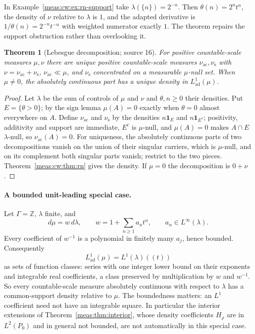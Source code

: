\documentclass[11pt]{article}
\numberwithin{equation}{section}
\newtheorem{theorem}{Theorem}[section]
\theoremstyle{definition}
\theoremstyle{remark}
\newcommand{\Z}{\mathbb Z}
\newcommand{\ind}{\mathbf 1}
\newcommand{\Lad}{L^1_{\mathrm{ad}}}
\begin{document}
In Example~\ref{meas:cw:ex:rn-support} take $\lambda(\{n\})=2^{-n}$. Then
$\theta(n)=2^nt^n$, the density of $\nu$ relative to $\lambda$ is $1$, and the adapted
derivative is $1/\theta(n)=2^{-n}t^{-n}$ with weighted numerator exactly $1$. The
theorem repairs the support obstruction rather than overlooking it.

\begin{theorem}[Lebesgue decomposition; source 16]\label{meas:cw:thm:lebesgue}
For positive countable-scale measures $\mu,\nu$ there are unique positive
countable-scale measures $\nu_{\mathrm{ac}},\nu_{\mathrm s}$ with
$\nu=\nu_{\mathrm{ac}}+\nu_{\mathrm s}$, $\nu_{\mathrm{ac}}\ll\mu$, and
$\nu_{\mathrm s}$ concentrated on a measurable $\mu$-null set. When $\mu\ne0$, the
absolutely continuous part has a unique density in $\Lad(\mu)$.
\end{theorem}
\begin{proof}
Let $\lambda$ be the sum of controls of $\mu$ and $\nu$ and $\theta,n\ge0$ their
densities. Put $E=\{\theta>0\}$; by the sign lemma $\mu(A)=0$ exactly when $\theta=0$
almost everywhere on $A$. Define $\nu_{\mathrm{ac}}$ and $\nu_{\mathrm s}$ by the
densities $n\ind_E$ and $n\ind_{E^c}$; positivity, additivity and support are
immediate, $E^c$ is $\mu$-null, and $\mu(A)=0$ makes $A\cap E$ $\lambda$-null, so
$\nu_{\mathrm{ac}}(A)=0$. For uniqueness, the absolutely continuous parts of two
decompositions vanish on the union of their singular carriers, which is
$\mu$-null, and on its complement both singular parts vanish; restrict to the two
pieces. Theorem~\ref{meas:cw:thm:rn} gives the density. If $\mu=0$ the
decomposition is $0+\nu$.
\end{proof}

\paragraph{A bounded unit-leading special case.} Let $\Gamma=\Z$, $\lambda$ finite, and
\begin{equation}\label{meas:cw:eq:bounded-unit}
 d\mu=w\,d\lambda,\qquad w=1+\sum_{n\ge1}a_nt^n,\qquad a_n\in L^\infty(\lambda).
\end{equation}
Every coefficient of $w^{-1}$ is a polynomial in finitely many $a_j$, hence
bounded. Consequently
\begin{equation}\label{meas:cw:eq:domain-unit}
 \Lad(\mu)=L^1(\lambda)((t))
\end{equation}
as sets of function classes: series with one integer lower bound on their
exponents and integrable real coefficients, a class preserved by multiplication
by $w$ and $w^{-1}$. So every countable-scale measure absolutely continuous with
respect to $\lambda$ has a common-support density relative to $\mu$. The
boundedness matters: an $L^1$ coefficient need not have an integrable square.
In particular the interior extensions of Theorem~\ref{meas:thm:interior}, whose
density coefficients $H_\rho$ are in $L^2(P_0)$ and in general not bounded, are not
automatically in this special case.
\end{document}

